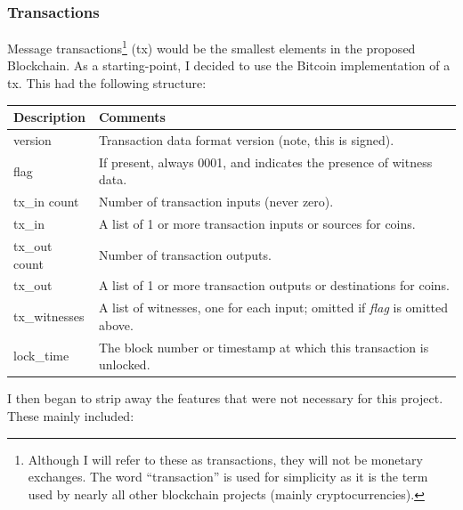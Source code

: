 \documentclass{article}
\begin{document}
\subsubsection{Transactions}
Message transactions\footnote{Although I will refer to these as transactions, they will not be monetary exchanges. The word ``transaction'' is used for simplicity as it is the term used by nearly all other blockchain projects (mainly cryptocurrencies).} (tx) would be the smallest elements in the proposed Blockchain. As a starting-point, I decided to use the Bitcoin implementation of a tx\cite{bitcoin_protocol}. This had the following structure:

\begin{table}[H]
\centering
\begin{tabular}{ |l|p{8.5cm}| }
\hline
\rowcolor{tblgrey}
Description   & Comments                                                                   \\ \hline
version       & Transaction data format version (note, this is signed).                    \\ \hline
flag          & If present, always 0001, and indicates the presence of witness data.       \\ \hline
tx\_in count  & Number of transaction inputs (never zero).                                 \\ \hline
tx\_in        & A list of 1 or more transaction inputs or sources for coins.               \\ \hline
tx\_out count & Number of transaction outputs.                                             \\ \hline
tx\_out       & A list of 1 or more transaction outputs or destinations for coins.         \\ \hline
tx\_witnesses & A list of witnesses, one for each input; omitted if \textit{flag} is omitted above. \\ \hline
lock\_time    & The block number or timestamp at which this transaction is unlocked.       \\ \hline
\end{tabular}
\end{table}

I then began to strip away the features that were not necessary for this project. These mainly included:
\end{document}
